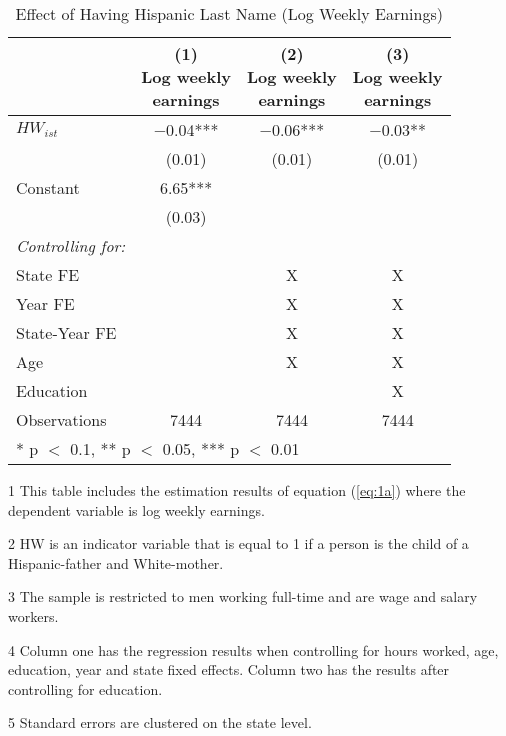 \begin{table}[H]
\centering\centering
\caption{Effect of Having Hispanic Last Name (Log Weekly Earnings) \label{tab:lastnamereg-weekearm}}
\centering
\begin{threeparttable}
\begin{tabular}[t]{lccc}
\toprule
  & \specialcell{(1) \\ Log weekly \\ earnings} & \specialcell{(2) \\ Log weekly \\ earnings} & \specialcell{(3) \\  Log weekly \\ earnings}\\
\midrule
$HW_{ist}$ & \num{-0.04}*** & \num{-0.06}*** & \num{-0.03}**\\
 & (\num{0.01}) & (\num{0.01}) & (\num{0.01})\\
Constant & \num{6.65}*** &  & \\
 & (\num{0.03}) &  & \\
\midrule
\textit{Controlling for:} &  &  & \\
State FE &  & X & X\\
Year FE &  & X & X\\
State-Year FE &  & X & X\\
Age &  & X & X\\
Education &  &  & X\\
Observations & \num{7444} & \num{7444} & \num{7444}\\
\bottomrule
\multicolumn{4}{l}{\rule{0pt}{1em}* p $<$ 0.1, ** p $<$ 0.05, *** p $<$ 0.01}\\
\end{tabular}
\begin{tablenotes}
\item[1] {\footnotesize{This table includes the estimation results of equation (\ref{eq:1a}) where the dependent variable is log weekly earnings.}}
\item[2] {\footnotesize{HW is an indicator variable that is equal to 1 if a person is the child of a Hispanic-father and White-mother.}}
\item[3] {\footnotesize{The sample is restricted to men working full-time and are wage and salary workers.}}
\item[4] {\footnotesize{Column one has the regression results when controlling for hours worked, age, education, year and state fixed effects. Column two has the results after controlling for education.}}
\item[5] {\footnotesize{Standard errors are clustered on the state level.}}
\end{tablenotes}
\end{threeparttable}
\end{table}
